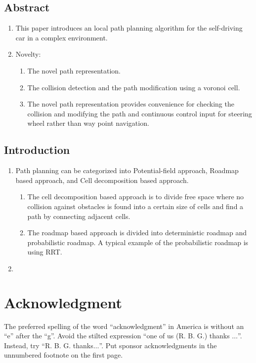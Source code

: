 \documentclass[conference]{IEEEtran}
\begin{document}
\subsection{Abstract}
\begin{enumerate}
	\item This paper introduces an local path planning algorithm for the self-driving car in a complex environment.
	\item Novelty:
		\begin{enumerate}
			\item The novel path representation.
			\item The collision detection and the path modification using a voronoi cell.
			\item The novel path representation provides convenience for checking the collision and modifying the path and continuous control input for steering wheel rather than way point navigation.
		\end{enumerate}
\end{enumerate}
\subsection{Introduction}
\begin{enumerate}
	\item Path planning can be categorized into Potential-field approach\cite{realtime}, Roadmap based approach, and Cell decomposition based approach.
		\begin{enumerate}
			\item The cell decomposition based approach is to divide free space where no collision against obstacles is found into a certain size of cells and find a path by connecting adjacent cells.
			\item The roadmap based approach is divided into deterministic roadmap and probabilistic roadmap. A typical example of the probabilistic roadmap is using RRT.
		\end{enumerate}
	\item 
\end{enumerate}


\section*{Acknowledgment}

The preferred spelling of the word ``acknowledgment'' in America is without 
an ``e'' after the ``g''. Avoid the stilted expression ``one of us (R. B. 
G.) thanks $\ldots$''. Instead, try ``R. B. G. thanks$\ldots$''. Put sponsor 
acknowledgments in the unnumbered footnote on the first page.



 
\end{document}
